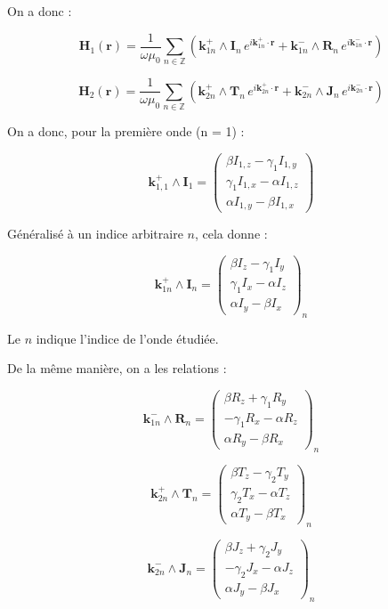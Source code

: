 \documentclass{article}
\begin{document}
On a donc : 

\[
\mathbf{H}_1(\mathbf{r}) = \frac{1}{\omega \mu_0} \sum_{n \in \mathbb{Z}} 
\left( \mathbf{k}_{1n}^{+} \wedge \mathbf{I}_n \, e^{i \mathbf{k}_{1n}^{+} \cdot \mathbf{r}} + 
       \mathbf{k}_{1n}^{-} \wedge \mathbf{R}_n \, e^{i \mathbf{k}_{1n}^{-} \cdot \mathbf{r}} \right)
\]

\[
\mathbf{H}_2(\mathbf{r}) = \frac{1}{\omega \mu_0} \sum_{n \in \mathbb{Z}} 
\left( \mathbf{k}_{2n}^{+} \wedge \mathbf{T}_n \, e^{i \mathbf{k}_{2n}^{+} \cdot \mathbf{r}} + 
       \mathbf{k}_{2n}^{-} \wedge \mathbf{J}_n \, e^{i \mathbf{k}_{2n}^{-} \cdot \mathbf{r}} \right)
\]

On a donc, pour la première onde (n = 1) :

\[
\mathbf{k}_{1,1}^{+} \wedge \mathbf{I}_1 =
\begin{pmatrix}
\beta I_{1,z} - \gamma_1 I_{1,y} \\
\gamma_1 I_{1,x} - \alpha I_{1,z} \\
\alpha I_{1,y} - \beta I_{1,x}
\end{pmatrix}
\]

Généralisé à un indice arbitraire \( n \), cela donne :

\[
\mathbf{k}_{1n}^{+} \wedge \mathbf{I}_n =
\begin{pmatrix}
\beta I_{z} - \gamma_1 I_{y} \\
\gamma_1 I_{x} - \alpha I_{z} \\
\alpha I_{y} - \beta I_{x}
\end{pmatrix}_n
\]

Le \( n \) indique l'indice de l'onde étudiée.

De la même manière, on a les relations :

\[
\mathbf{k}_{1n}^{-} \wedge \mathbf{R}_n =
\begin{pmatrix}
\beta R_{z} + \gamma_1 R_{y} \\
- \gamma_1 R_{x} - \alpha R_{z} \\
\alpha R_{y} - \beta R_{x}
\end{pmatrix}_n
\]

\[
\mathbf{k}_{2n}^{+} \wedge \mathbf{T}_n =
\begin{pmatrix}
\beta T_{z} - \gamma_2 T_{y} \\
\gamma_2 T_{x} - \alpha T_{z} \\
\alpha T_{y} - \beta T_{x}
\end{pmatrix}_n
\]

\[
\mathbf{k}_{2n}^{-} \wedge \mathbf{J}_n =
\begin{pmatrix}
\beta J_{z} + \gamma_2 J_{y} \\
- \gamma_2 J_{x} - \alpha J_{z} \\
\alpha J_{y} - \beta J_{x}
\end{pmatrix}_n
\]
\end{document}

